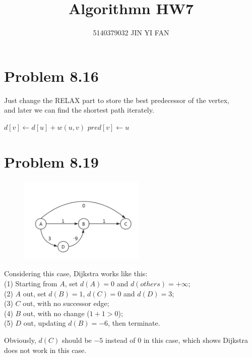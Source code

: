 \documentclass[a4paper]{article}
\title{\textbf{Algorithmn HW7}}
\author{5140379032 JIN YI FAN}
\date{}
\begin{document}
\maketitle
\begin{spacing}{1.3}

\section*{Problem 8.16}
Just change the RELAX part to store the best predecessor of the vertex, 
\\and later we can find the shortest path iterately.
\begin{algorithmic}[1]
\State $d[v]\gets d[u]+w(u,v)$
\State $pred[v]\gets u$
\EndIf
\EndProcedure
\end{algorithmic}

\section*{Problem 8.19}
\begin{multicols}{2}
\begin{figure}[H]
    \centering
    \includegraphics[width=6cm]{dij.png}
\end{figure}
Considering this case, Dijkstra works like this:
\\(1) Starting from $A$, set $d(A)=0$ and $d(others)=+\infty$;
\\(2) $A$ out, set $d(B)=1$, $d(C)=0$ and $d(D)=3$;
\\(3) $C$ out, with no successor edge;
\\(4) $B$ out, with no change ($1+1>0$);
\\(5) $D$ out, updating $d(B)=-6$, then terminate.
\end{multicols}
\noindent Obviously, $d(C)$ should be $-5$ instead of $0$ in this case, which shows Dijkstra does not work in this case.


\end{spacing}
\end{document}
